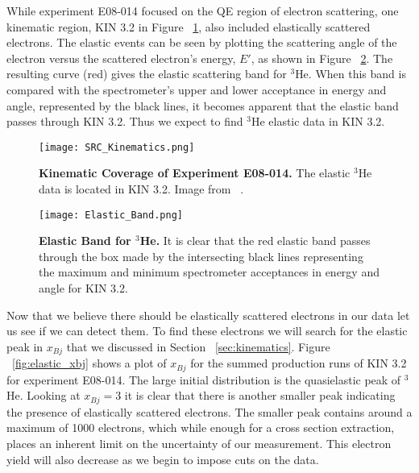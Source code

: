 While experiment E08-014 focused on the QE region of electron scattering, one kinematic region, KIN 3.2 in Figure ~\ref{fig:kin3.2}, also included elastically scattered electrons. The elastic events can be seen by plotting the scattering angle of the electron versus the scattered electron's energy, $E'$, as shown in Figure ~\ref{fig:elastic_band}. The resulting curve (red) gives the elastic scattering band for $^3$He. When this band is compared with the spectrometer's upper and lower acceptance in energy and angle, represented by the black lines, it becomes apparent that the elastic band passes through KIN 3.2. Thus we expect to find $^3$He elastic data in KIN 3.2. 

\begin{figure}[!ht]
\begin{center}
\texttt{[image: SRC\_Kinematics.png]}
\end{center}
\caption[Kinematic Coverage of Experiment E08-014]{
{\bf{Kinematic Coverage of Experiment E08-014.}} The elastic $^3$He data is located in KIN 3.2. Image from ~\cite{Thesis:Ye}.}
\label{fig:kin3.2}
\end{figure}

\begin{figure}[!ht]
\begin{center}
\texttt{[image: Elastic\_Band.png]}
\end{center}
\caption[Elastic Band for $^3$He]{
{\bf{Elastic Band for $^3$He.}} It is clear that the red elastic band passes through the box made by the intersecting black lines representing the maximum and minimum spectrometer acceptances in energy and angle for KIN 3.2.}
\label{fig:elastic_band}
\end{figure}

Now that we believe there should be elastically scattered electrons in our data let us see if we can detect them. To find these electrons we will search for the elastic peak in $x_{Bj}$ that we discussed in Section ~\ref{sec:kinematics}. Figure ~\ref{fig:elastic_xbj} shows a plot of $x_{Bj}$ for the summed production runs of KIN 3.2 for experiment E08-014. The large initial distribution is the quasielastic peak of $^3$He. Looking at $x_{Bj}=3$ it is clear that there is another smaller peak indicating the presence of elastically scattered electrons. The smaller peak contains around a maximum of 1000 electrons, which while enough for a cross section extraction, places an inherent limit on the uncertainty of our measurement. This electron yield will also decrease as we begin to impose cuts on the data.

